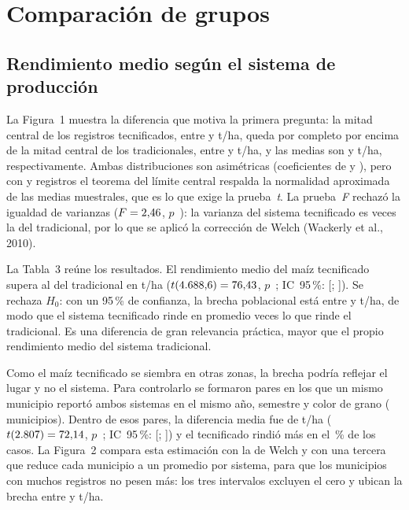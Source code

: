 \documentclass[12pt,letterpaper]{article}
\begin{document}
\section{Comparación de grupos}

\subsection{Rendimiento medio según el sistema de producción}

La Figura~1 muestra la diferencia que motiva la primera pregunta: la mitad
central de los registros tecnificados, entre \QITec{} y \QIIITec{} t/ha,
queda por completo por encima de la mitad central de los tradicionales, entre
\QITrad{} y \QIIITrad{} t/ha, y las medias son \MediaTec{} y \MediaTrad{} t/ha,
respectivamente. Ambas
distribuciones son asimétricas (coeficientes de \AsimTec{} y \AsimTrad), pero
con \NTec{} y \NTrad{} registros el teorema del límite central respalda la
normalidad aproximada de las medias muestrales, que es lo que exige la
prueba~\textit{t}. La prueba~\textit{F} rechazó la igualdad de varianzas
($F = 2{,}46$, $p$~\VTpRel): la varianza del sistema tecnificado es \VTF{} veces
la del tradicional, por lo que se aplicó la corrección de Welch (Wackerly et
al., 2010).

La Tabla~3 reúne los resultados. El rendimiento medio del maíz tecnificado
supera al del tradicional en \WDif{} t/ha ($t(4.688{,}6) = 76{,}43$, $p$~\WpRel;
IC~95\,\%: [\WicInf; \WicSup]). Se rechaza $H_0$: con un 95\,\% de confianza,
la brecha poblacional está entre \WicInf{} y \WicSup{} t/ha, de modo que el
sistema tecnificado rinde en promedio \RazonMedias{} veces lo que rinde el
tradicional. Es una diferencia de gran relevancia práctica, mayor que el
propio rendimiento medio del sistema tradicional.

Como el maíz tecnificado se siembra en otras zonas, la brecha podría reflejar
el lugar y no el sistema. Para controlarlo se formaron \NPares{} pares en los
que un mismo municipio reportó ambos sistemas en el mismo año, semestre y
color de grano (\NMunPares{} municipios). Dentro de esos pares, la diferencia
media fue de \PDif{} t/ha ($t(2.807) = 72{,}14$, $p$~\PpRel; IC~95\,\%: [\PicInf;
\PicSup]) y el tecnificado rindió más en el \PPctTecMayor\,\% de los casos. La
Figura~2 compara esta estimación con la de Welch y con una tercera que reduce
cada municipio a un promedio por sistema, para que los municipios con muchos
registros no pesen más: los tres intervalos excluyen el cero y ubican la
brecha entre \BrechaMinIC{} y \BrechaMaxIC{} t/ha.
\end{document}
